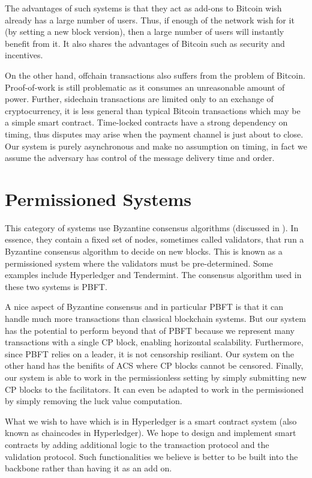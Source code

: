 The advantages of such systems is that they act as add-ons to Bitcoin wish already has a large number of users.
Thus, if enough of the network wish for it (by setting a new block version),
then a large number of users will instantly benefit from it.
It also shares the advantages of Bitcoin such as security and incentives.

On the other hand, offchain transactions also suffers from the problem of Bitcoin.
Proof-of-work is still problematic as it consumes an unreasonable amount of power.
Further, sidechain transactions are limited only to an exchange of cryptocurrency,
it is less general than typical Bitcoin transactions which may be a simple smart contract.
Time-locked contracts have a strong dependency on timing, thus disputes may arise when the payment channel is just about to close.
Our system is purely asynchronous and make no assumption on timing,
in fact we assume the adversary has control of the message delivery time and order.

\section{Permissioned Systems}

This category of systems use Byzantine consensus algorithms (discussed in ).
In essence, they contain a fixed set of nodes, sometimes called validators,
that run a Byzantine consensus algorithm to decide on new blocks.
This is known as a permissioned system where the validators must be pre-determined.
Some examples include Hyperledger and Tendermint.
The consensus algorithm used in these two systems is PBFT.

A nice aspect of Byzantine consensus and in particular PBFT is that it can handle much more transactions than classical blockchain systems.
But our system has the potential to perform beyond that of PBFT because we represent many transactions with a single CP block,
enabling horizontal scalability.
Furthermore, since PBFT relies on a leader, it is not censorship resiliant.
Our system on the other hand has the benifits of ACS where CP blocks cannot be censored.
Finally, our system is able to work in the permissionless setting by simply submitting new CP blocks to the facilitators.
It can even be adapted to work in the permissioned by simply removing the luck value computation.

What we wish to have which is in Hyperledger is a smart contract system (also known as chaincodes in Hyperledger).
We hope to design and implement smart contracts by adding additional logic to the transaction protocol and the validation protocol.
Such functionalities we believe is better to be built into the backbone rather than having it as an add on.


